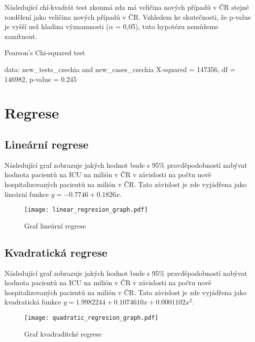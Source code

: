 \documentclass[a4paper, 12pt]{article}
\begin{document}
Následující chí-kvadrát test zkoumá zda má veličina nových případů v ČR stejné
rozdělení jako veličina nových případů v ČR. Vzhledem ke skutečnosti, že p-value je vyšší
než hladina významnosti ($\alpha$ = 0,05), tuto hypotézu nemůžeme zamítnout.

\begin{Schunk}
\begin{Soutput}
	Pearson's Chi-squared test

data:  new_tests_czechia and new_cases_czechia
X-squared = 147356, df = 146982, p-value = 0.245
\end{Soutput}
\end{Schunk}

\section{Regrese}
\subsection{Lineární regrese}

Následující graf zobrazuje jakých hodnot bude s 95\% pravděpodobností nabývat
hodnota pacientů na ICU na milión v ČR v závislosti na počtu nově hospitalizovaných
pacientů na milión v ČR. Tato závislost je zde vyjádřena jako lineární funkce $y = -0.7746 + 0.1826x$.

\begin{figure}[H]
\centering
\texttt{[image: linear\_regresion\_graph.pdf]}
\caption{Graf lineární regrese}

\end{figure}

\clearpage

\subsection{Kvadratická regrese}

Následující graf zobrazuje jakých hodnot bude s 95\% pravděpodobností nabývat
hodnota pacientů na ICU na milión v ČR v závislosti na počtu nově hospitalizovaných
pacientů na milión v ČR. Tato závislost je zde vyjádřena jako kvadratická funkce $y = 1.9982244 + 0.1074610x + 0.0001102x^2$.

\begin{figure}[H]
\centering
\texttt{[image: quadratic\_regresion\_graph.pdf]}
\caption{Graf kvadraditcké regrese}

\end{figure}
\end{document}
